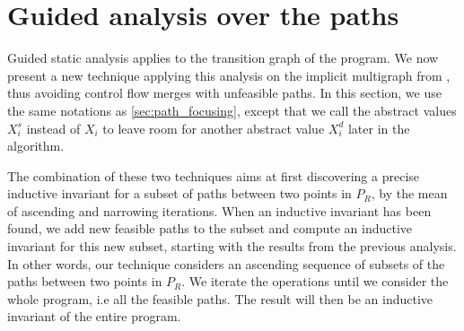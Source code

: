 \documentclass[preprint]{sigplanconf}
\begin{document}
\section{Guided analysis over the paths}
\label{sec:guided_multigraph}

Guided static analysis \cite{DBLP:conf/sas/GopanR07} applies to the transition
graph of the program. We now present a new technique applying this analysis on the implicit
multigraph from \cite{Monniaux_Gonnord_SAS11}, thus avoiding control flow merges with
unfeasible paths.
In this section, we use the same notations as \ref{sec:path_focusing}, except
that we call the abstract values $X_i^s$ instead of $X_i$ to leave room for
another abstract value $X_i^d$ later in the algorithm.

The combination of these two techniques aims at first discovering a precise
inductive invariant for a subset of paths between two points in $P_R$, 
by the mean of ascending and narrowing iterations. When an
inductive invariant has been found, we add new feasible paths to the subset and
compute an inductive invariant for this new subset, starting with the results
from the previous analysis.
In other words, our technique considers an ascending sequence of
subsets of the paths between two points in $P_R$.
We iterate the operations until we consider the whole program, i.e all the
feasible paths. The result will then be an inductive invariant of the entire program.
\end{document}
